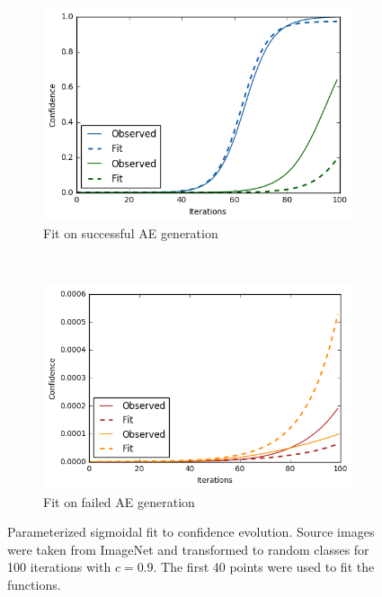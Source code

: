 \documentclass[11pt, a4paper]{article}
\begin{document}
\begin{figure}[h!tb]
    \centering
    \begin{subfigure}[t]{0.45\textwidth}
    		\centering
        \includegraphics[scale=0.5]{progress/imagenet_0dot9c_100iter_800samples-success.png}
        \caption{Fit on successful AE generation}
        \label{fig:progress-fit-success}
    \end{subfigure}
    ~ %
    \begin{subfigure}[t]{0.45\textwidth}
    		\centering
        \includegraphics[scale=0.5]{progress/imagenet_0dot9c_100iter_800samples-failure.png}
        \caption{Fit on failed AE generation}
        \label{fig:progress-fit-failure}
    \end{subfigure}
    \caption[Parameterized sigmoidal fit to confidence evolution]{Parameterized sigmoidal fit to confidence evolution. Source images were taken from ImageNet and transformed to random classes for 100 iterations with $c = 0.9$. The first 40 points were used to fit the functions.}
    \label{fig:progress-fit}
\end{figure}
\end{document}
